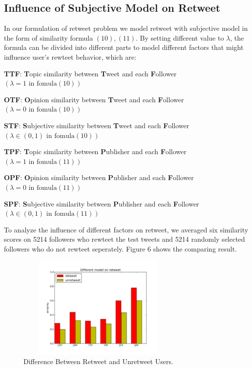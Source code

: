 \documentclass{acm_proc_article-sp}
\begin{document}
\subsection{Influence of Subjective  Model on Retweet}
In our formulation of retweet problem we model retweet with subjective model in the form of similarity formula $ \mathrm{\left( 10 \right), \left( 11 \right) } $.
By setting different value to $ \lambda $, the formula can be divided into different parts to model different factors that might influence user's rewteet behavior, which are:
\begin{itemize*}
\item \textbf{TTF}: \textbf{T}opic similarity between \textbf{T}weet and each \textbf{F}ollower $ \left( \lambda =1  \text{ in fomula} \left( 10 \right)  \right) $ 
\item \textbf{OTF}: \textbf{O}pinion similarity between \textbf{T}weet and each \textbf{F}ollower $ \left( \lambda =0 \text{ in fomula} \left( 10 \right)  \right) $
\item \textbf{STF}: \textbf{S}ubjective similarity between \textbf{T}weet and each \textbf{F}ollower $ \left( \lambda \in \left( 0,1 \right)   \text{ in fomula} \left( 10 \right)  \right) $ 
\item \textbf{TPF}: \textbf{T}opic similarity between \textbf{P}ublisher and each \textbf{F}ollower $ \left( \lambda =1  \text{ in fomula} \left( 11 \right)  \right) $ 
\item \textbf{OPF}: \textbf{O}pinion similarity between \textbf{P}ublisher and each \textbf{F}ollower $ \left( \lambda =0 \text{ in fomula} \left( 11 \right)  \right) $
\item \textbf{SPF}: \textbf{S}ubjective similarity between \textbf{P}ublisher and each \textbf{F}ollower $ \left( \lambda \in \left( 0,1 \right)   \text{ in fomula} \left( 11 \right)  \right) $
\end{itemize*}
To analyze the influence of different factors on retweet, we averaged six similarity scores on 5214 followers who rewteet the test tweets and 5214 randomly selected followers who do not rewteet seperately. 
Figure 6 shows the comparing result.
\begin{figure}
\centering
\includegraphics[width=3.2in,height=2.0in]{component.pdf}
\caption{Difference Between Retweet and Unretweet Users.}
\label{fig:graph6}
\end{figure}
\end{document}
